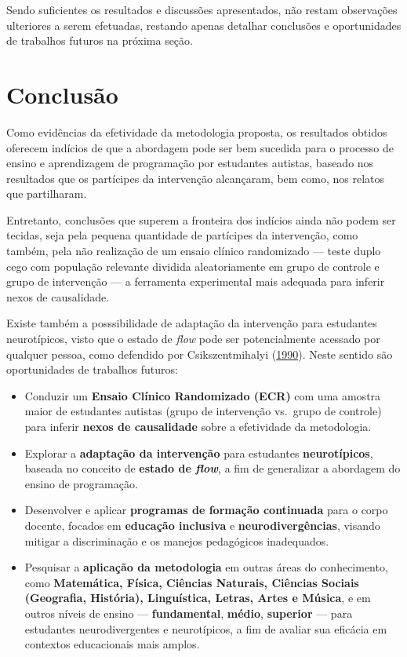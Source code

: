 \documentclass[
  12pt,
  a4paper,
]{article}
\providecommand{\tightlist}{%
  \setlength{\itemsep}{0pt}\setlength{\parskip}{0pt}}
\begin{document}
Sendo suficientes os resultados e discussões apresentados, não restam
observações ulteriores a serem efetuadas, restando apenas detalhar
conclusões e oportunidades de trabalhos futuros na próxima seção.

\hypertarget{sec:conclusao}{%
\section{Conclusão}\label{sec:conclusao}}

Como evidências da efetividade da metodologia proposta, os resultados
obtidos oferecem indícios de que a abordagem pode ser bem sucedida para
o processo de ensino e aprendizagem de programação por estudantes
autistas, baseado nos resultados que os partícipes da intervenção
alcançaram, bem como, nos relatos que partilharam.

Entretanto, conclusões que superem a fronteira dos indícios ainda não
podem ser tecidas, seja pela pequena quantidade de partícipes da
intervenção, como também, pela não realização de um ensaio clínico
randomizado --- teste duplo cego com população relevante dividida
aleatoriamente em grupo de controle e grupo de intervenção --- a
ferramenta experimental mais adequada para inferir nexos de causalidade.

Existe também a posssibilidade de adaptação da intervenção para
estudantes neurotípicos, visto que o estado de \emph{flow} pode ser
potencialmente acessado por qualquer pessoa, como defendido por
Csikszentmihalyi (\protect\hyperlink{ref-csikszentmihalyi1990}{1990}).
Neste sentido são oportunidades de trabalhos futuros:

\begin{itemize}
\tightlist
\item
  Conduzir um \textbf{Ensaio Clínico Randomizado (ECR)} com uma amostra
  maior de estudantes autistas (grupo de intervenção vs.~grupo de
  controle) para inferir \textbf{nexos de causalidade} sobre a
  efetividade da metodologia.
\item
  Explorar a \textbf{adaptação da intervenção} para estudantes
  \textbf{neurotípicos}, baseada no conceito de \textbf{estado de
  \emph{flow}}, a fim de generalizar a abordagem do ensino de
  programação.
\item
  Desenvolver e aplicar \textbf{programas de formação continuada} para o
  corpo docente, focados em \textbf{educação inclusiva} e
  \textbf{neurodivergências}, visando mitigar a discriminação e os
  manejos pedagógicos inadequados.
\item
  Pesquisar a \textbf{aplicação da metodologia} em outras áreas do
  conhecimento, como \textbf{Matemática, Física, Ciências Naturais,
  Ciências Sociais (Geografia, História), Linguística, Letras, Artes e
  Música}, e em outros níveis de ensino --- \textbf{fundamental},
  \textbf{médio}, \textbf{superior} --- para estudantes neurodivergentes
  e neurotípicos, a fim de avaliar sua eficácia em contextos
  educacionais mais amplos.
\end{itemize}
\end{document}

